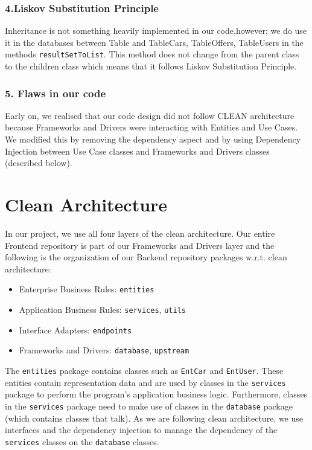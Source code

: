 \documentclass[fontsize=14pt]{article}
\def\code#1{\texttt{#1}}
\begin{document}
\subsubsection*{4.Liskov Substitution Principle}
Inheritance is not something heavily implemented in our code,however; we do use it in the databases between Table and TableCars, TableOffers, TableUsers in the methods \texttt{resultSetToList}. This method does not change from the parent class to the children class which means that it follows Liskov Substitution Principle. 
 
\subsubsection*{5. Flaws in our code}

Early on, we realised that our code design did not follow CLEAN architecture because Frameworks and Drivers were interacting with Entities and Use Cases. We modified this by removing the dependency aspect and by using Dependency Injection between Use Case classes and Frameworks and Drivers classes (described below).
 
\section*{Clean Architecture}

In our project, we use all four layers of the clean architecture. Our entire Frontend repository is part of our Frameworks and Drivers layer and the following is the organization of our Backend repository packages w.r.t. clean architecture:
\begin{itemize}
    \item Enterprise Business Rules: \code{entities}
    \item Application Business Rules: \code{services}, \code{utils}
    \item Interface Adapters: \code{endpoints}
    \item Frameworks and Drivers: \code{database}, \code{upstream}
\end{itemize}

The \code{entities} package contains classes such as \code{EntCar} and \code{EntUser}. These entities contain representation data and are used by classes in the \code{services} package to perform the program's application business logic. Furthermore, classes in the \code{services} package need to make use of classes in the \code{database} package (which contains classes that talk). As we are following clean architecture, we use interfaces and the dependency injection to manage the dependency of the \code{services} classes on the \code{database} classes.
\end{document}
